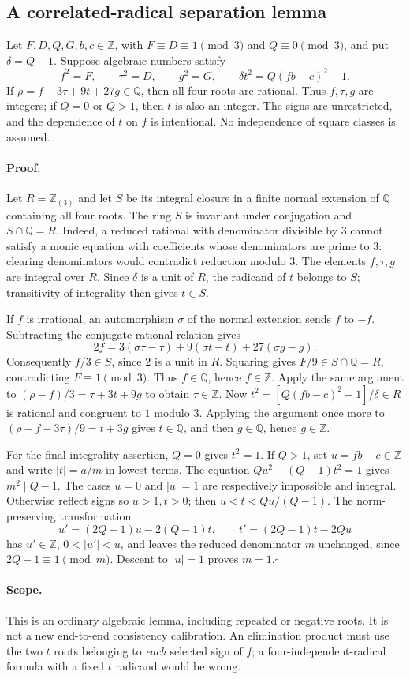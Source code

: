 \subsection*{A correlated-radical separation lemma}
Let $F,D,Q,G,b,c\in\mathbb Z$, with $F\equiv D\equiv1\pmod3$ and
$Q\equiv0\pmod3$, and put $\delta=Q-1$. Suppose algebraic numbers satisfy
\[
 f^2=F,\qquad \tau^2=D,\qquad g^2=G,\qquad
 \delta t^2=Q(fb-c)^2-1.
\]
If $\rho=f+3\tau+9t+27g\in\mathbb Q$, then all four roots are rational.
Thus $f,\tau,g$ are integers; if $Q=0$ or $Q>1$, then $t$ is also an
integer. The signs are unrestricted, and the dependence of $t$ on $f$
is intentional. No independence of square classes is assumed.

\paragraph{Proof.}
Let $R=\mathbb Z_{(3)}$ and let $S$ be its integral closure in a finite
normal extension of $\mathbb Q$ containing all four roots. The ring $S$
is invariant under conjugation and $S\cap\mathbb Q=R$. Indeed, a reduced
rational with denominator divisible by $3$ cannot satisfy a monic equation
with coefficients whose denominators are prime to $3$: clearing denominators
would contradict reduction modulo $3$. The elements $f,\tau,g$ are integral
over $R$. Since $\delta$ is a unit of $R$, the radicand of $t$ belongs to
$S$; transitivity of integrality then gives $t\in S$.

If $f$ is irrational, an automorphism $\sigma$ of the normal extension
sends $f$ to $-f$. Subtracting the conjugate rational relation gives
\[
 2f=3(\sigma\tau-\tau)+9(\sigma t-t)+27(\sigma g-g).
\]
Consequently $f/3\in S$, since $2$ is a unit in $R$. Squaring gives
$F/9\in S\cap\mathbb Q=R$, contradicting $F\equiv1\pmod3$.
Thus $f\in\mathbb Q$, hence $f\in\mathbb Z$. Apply the same argument to
$(\rho-f)/3=\tau+3t+9g$ to obtain $\tau\in\mathbb Z$.
Now $t^2=[Q(fb-c)^2-1]/\delta\in R$ is rational and congruent to $1$
modulo $3$. Applying the argument once more to
$(\rho-f-3\tau)/9=t+3g$ gives $t\in\mathbb Q$, and then
$g\in\mathbb Q$, hence $g\in\mathbb Z$.

For the final integrality assertion, $Q=0$ gives $t^2=1$. If $Q>1$, set
$u=fb-c\in\mathbb Z$ and write $|t|=a/m$ in lowest terms. The equation
$Qu^2-(Q-1)t^2=1$ gives $m^2\mid Q-1$. The cases $u=0$ and $|u|=1$
are respectively impossible and integral. Otherwise reflect signs so
$u>1,t>0$; then $u<t<Qu/(Q-1)$. The norm-preserving transformation
\[
 u'=(2Q-1)u-2(Q-1)t,\qquad t'=(2Q-1)t-2Qu
\]
has $u'\in\mathbb Z$, $0<|u'|<u$, and leaves the reduced denominator
$m$ unchanged, since $2Q-1\equiv1\pmod m$. Descent to $|u|=1$ proves
$m=1$.\hfill$\square$

\paragraph{Scope.}
This is an ordinary algebraic lemma, including repeated or negative roots.
It is not a new end-to-end consistency calibration. An elimination product
must use the two $t$ roots belonging to \emph{each} selected sign of $f$;
a four-independent-radical formula with a fixed $t$ radicand would be wrong.
